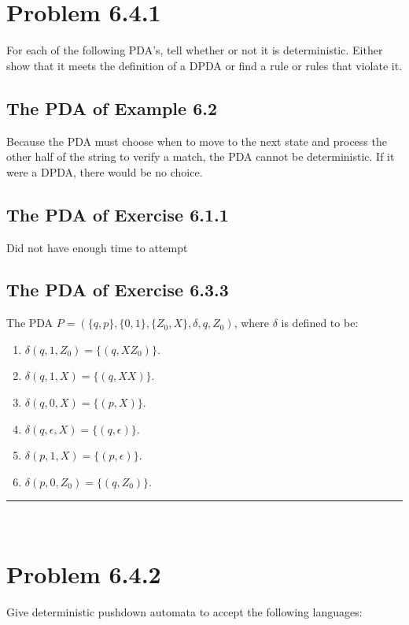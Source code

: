 \documentclass[20pt]{article} %
\begin{document}
\section{Problem 6.4.1}
For each of the following PDA's, tell whether or not it is deterministic.  Either show that it meets the definition of a DPDA or find a rule or rules that violate it.
\subsection{The PDA of Example 6.2}
Because the PDA must choose when to move to the next state and process the other half of the string to verify a match, the PDA cannot be deterministic. If it were a DPDA, there would be no choice.
\subsection{The PDA of Exercise 6.1.1}
Did not have enough time to attempt
\subsection{The PDA of Exercise 6.3.3}
The PDA $\!P = (\{q, p\}, \{0,1\}, \{Z_0,X\}, \delta, q , Z_0)$, where  $\delta$ is defined to be:
\begin{enumerate}
\item $\delta(q, 1, Z_0) = \{(q, XZ_0)\}$.
\item $\delta(q, 1, X) = \{(q, XX)\}$.
\item $\delta(q, 0, X) = \{(p, X)\}$.
\item $\delta(q, \epsilon, X) = \{(q, \epsilon)\}$.
\item $\delta(p, 1, X) = \{(p, \epsilon)\}$.
\item $\delta(p, 0, Z_0) = \{(q, Z_0)\}$.
\end{enumerate}
\noindent\rule{2cm}{0.4pt} \\

\section{Problem 6.4.2}
Give deterministic pushdown automata to accept the following languages:
\end{document}
